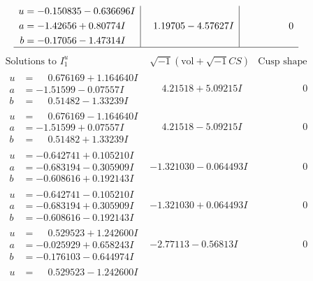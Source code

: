 \documentclass[1p]{elsarticle_modified}
\theoremstyle{definition}
\newcommand{\I}{\sqrt{-1}}
\begin{document}
$$\begin{array}{c|c|c}
\begin{aligned}
u &= -0.150835 - 0.636696 I \\
a &= -1.42656 + 0.80774 I \\
b &= -0.17056 - 1.47314 I\end{aligned}
 & \phantom{-}1.19705 - 4.57627 I & \phantom{-0.000000 } 0\\
 \hline 
 \end{array}$$\newpage$$\begin{array}{c|c|c}  
\text{Solutions to }I^u_{1}& \I (\text{vol} + \sqrt{-1}CS) & \text{Cusp shape}\\
 \hline 
\begin{aligned}
u &= \phantom{-}0.676169 + 1.164640 I \\
a &= -1.51599 - 0.07557 I \\
b &= \phantom{-}0.51482 - 1.33239 I\end{aligned}
 & \phantom{-}4.21518 + 5.09215 I & \phantom{-0.000000 } 0 \\ \hline\begin{aligned}
u &= \phantom{-}0.676169 - 1.164640 I \\
a &= -1.51599 + 0.07557 I \\
b &= \phantom{-}0.51482 + 1.33239 I\end{aligned}
 & \phantom{-}4.21518 - 5.09215 I & \phantom{-0.000000 } 0 \\ \hline\begin{aligned}
u &= -0.642741 + 0.105210 I \\
a &= -0.683194 - 0.305909 I \\
b &= -0.608616 + 0.192143 I\end{aligned}
 & -1.321030 - 0.064493 I & \phantom{-0.000000 } 0 \\ \hline\begin{aligned}
u &= -0.642741 - 0.105210 I \\
a &= -0.683194 + 0.305909 I \\
b &= -0.608616 - 0.192143 I\end{aligned}
 & -1.321030 + 0.064493 I & \phantom{-0.000000 } 0 \\ \hline\begin{aligned}
u &= \phantom{-}0.529523 + 1.242600 I \\
a &= -0.025929 + 0.658243 I \\
b &= -0.176103 - 0.644974 I\end{aligned}
 & -2.77113 - 0.56813 I & \phantom{-0.000000 } 0 \\ \hline\begin{aligned}
u &= \phantom{-}0.529523 - 1.242600 I \\

\end{aligned}
\end{array}$$
\end{document}
